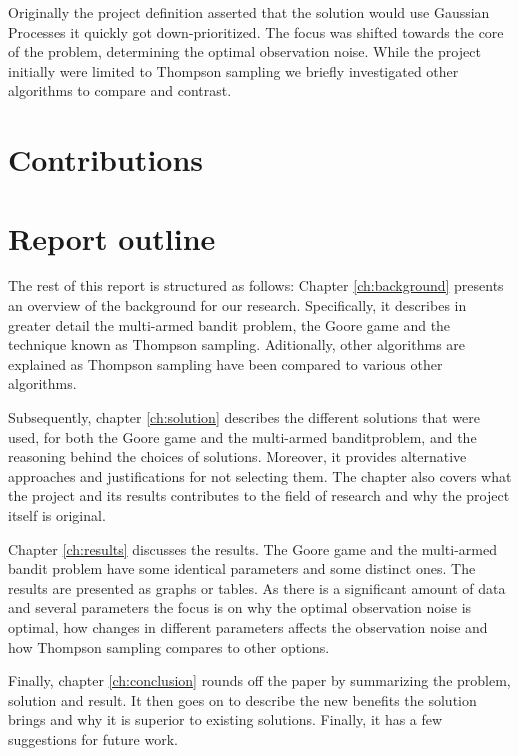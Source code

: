 Originally the project definition asserted that the solution would use Gaussian Processes it quickly got down-prioritized.
The focus was shifted towards the core of the problem, determining the optimal observation noise. While
the project initially were limited to Thompson sampling we briefly investigated other algorithms to compare
and contrast. 

\section{Contributions}

\section{Report outline}
The rest of this report is structured as follows: Chapter
\ref{ch:background} presents an overview of the background for our research.
Specifically, it describes in greater detail the multi-armed bandit problem, the Goore game and the
technique known as Thompson sampling. Aditionally, other algorithms are explained as Thompson sampling
have been compared to various other algorithms.

Subsequently, chapter \ref{ch:solution} describes the different solutions that were used, for both the Goore game
and the multi-armed banditproblem, and the reasoning behind the choices of solutions. Moreover, it provides 
alternative approaches and justifications for not selecting them. The chapter also covers what the project
and its results contributes to the field of research and why the project itself is original. 

Chapter \ref{ch:results} discusses the results. The Goore game and the multi-armed bandit problem have some
identical parameters and some distinct ones. The results are presented as graphs or tables. As there is a significant
amount of data and several parameters the focus is on why the optimal observation noise is optimal, how changes
in different parameters affects the observation noise and how Thompson sampling compares to other options.

Finally, chapter \ref{ch:conclusion} rounds off the paper by summarizing the problem, solution and result. It then goes
on to describe the new benefits the solution brings and why it is superior to existing solutions. Finally, it has a few 
suggestions for future work. 
